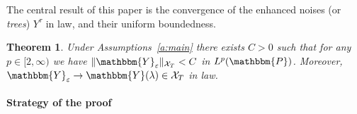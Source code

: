 \documentclass[a4paper,11pt]{article}
\newcommand{\tmtextit}[1]{{\itshape{#1}}}
\newtheorem{theorem}{Theorem}
\begin{document}
The central result of this paper is the convergence of the enhanced noises (or
\tmtextit{trees}) $Y^{\tau}$ in law, and their uniform boundedness.

\begin{theorem}
  \label{t:stoch-conv}Under Assumptions~\ref{a:main} there exists $C > 0$ such
  that for any $p \in [2, \infty)$ we have $\| \mathbbm{Y}_{\varepsilon}
  \|_{\mathcal{X}_T} < C$ in $L^p (\mathbbm{P})$. Moreover,
  $\mathbbm{Y}_{\varepsilon} \rightarrow \mathbbm{Y} (\lambda) \in
  \mathcal{X}_T$ in law.
\end{theorem}

\paragraph{Strategy of the proof}
\end{document}
